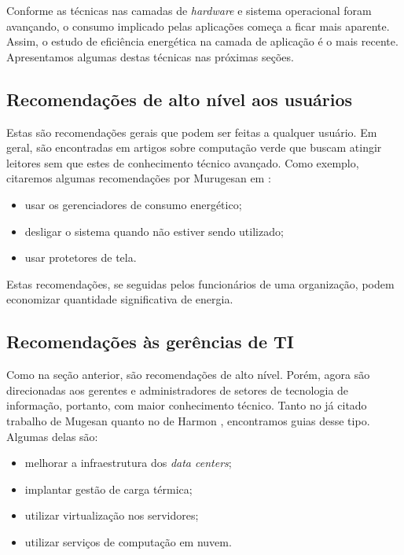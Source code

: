 Conforme as técnicas nas camadas de \emph{hardware} e sistema operacional foram avançando, o consumo implicado pelas aplicações começa a ficar mais aparente. Assim, o estudo de eficiência energética na camada de aplicação é o mais recente. Apresentamos algumas destas técnicas nas próximas seções.

\subsection{Recomendações de alto nível aos usuários}

Estas são recomendações gerais que podem ser feitas a qualquer usuário. Em geral, são encontradas em artigos sobre computação verde que buscam atingir leitores sem que estes de conhecimento técnico avançado. Como exemplo, citaremos algumas recomendações por Murugesan em \cite{murugesan2008harnessing}:
\begin{itemize}
    \item usar os gerenciadores de consumo energético;
    \item desligar o sistema quando não estiver sendo utilizado;
    \item usar protetores de tela.
\end{itemize}

Estas recomendações, se seguidas pelos funcionários de uma organização, podem economizar quantidade significativa de energia.

\subsection{Recomendações às gerências de TI}

Como na seção anterior, são recomendações de alto nível. Porém, agora são direcionadas aos gerentes e administradores de setores de tecnologia de informação, portanto, com maior conhecimento técnico. Tanto no já citado trabalho de Mugesan \cite{murugesan2008harnessing} quanto no de Harmon \cite{harmon2009sustainable}, encontramos guias desse tipo. Algumas delas são:
\begin{itemize}
    \item melhorar a infraestrutura dos \emph{data centers};
    \item implantar gestão de carga térmica;
    \item utilizar virtualização nos servidores;
    \item utilizar serviços de computação em nuvem.
\end{itemize}

